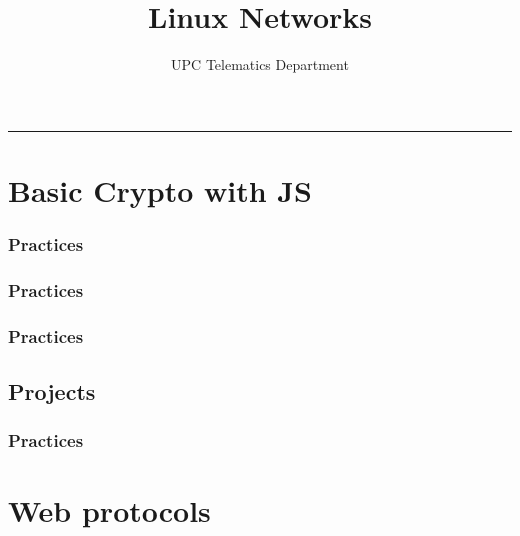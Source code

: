 \documentclass[english,10pt]{book}
\author{UPC Telematics Department}
\title{Linux Networks}
\date{}
\makeatletter
\def\thickhrulefill{\leavevmode \leaders \hrule height 1pt\hfill \kern \z@}
\def\maketitle{%
  \null
  \thispagestyle{empty}%
  {\large \raggedleft \@textoA\par}
  \vfill
  \begin{center}\leavevmode
    \normalfont
    {\LARGE\raggedleft \@author\par}%
    \thickhrulefill\par
    {\huge\raggedright \@title\par}%
    \vskip 1cm
  \end{center}%
  \vfill
  {\large \@textoB\par}
  \null

\clearpage
  }
\makeatother
\begin{document}
\maketitle
\pagestyle{empty}

% 

\setcounter{tocdepth}{2}
\tableofcontents
\pagestyle{plain}


\chapter{Basic Crypto with JS \label{chap:basic-crypto-js}}


\subsection{Practices}



\subsection{Practices}



\subsection{Practices}


\section{Projects}
\subsection{Practices}






\chapter{Web protocols\label{chap:web-protocols}}

\end{document}

